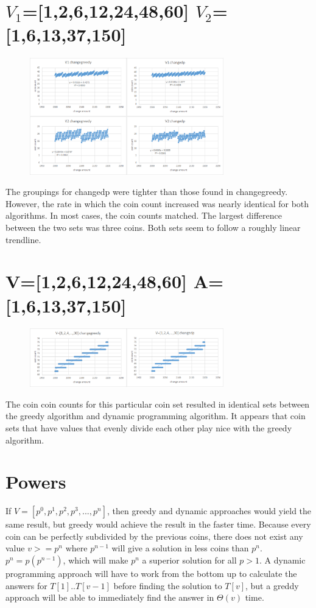 \documentclass[letWterpaper,10pt,titlepage]{article}
\begin{document}
\section{$V_1$=[1,2,6,12,24,48,60] $V_2$=[1,6,13,37,150]}
\begin{figure}[!h]
    \centering
    \includegraphics[width=0.75\textwidth]{./p5.eps}
\end{figure}
The groupings for changedp were tighter than those found in changegreedy. However, the rate in which the coin count increased was nearly identical for both algorithms. In most cases, the coin counts matched. The largest difference between the two sets was three coins. Both sets seem to follow a roughly linear trendline.

\section{V=[1,2,6,12,24,48,60] A=[1,6,13,37,150]}
\begin{figure}[!h]
    \centering
    \includegraphics[width=0.75\textwidth]{./p6.eps}
\end{figure}
The coin coin counts for this particular coin set resulted in identical sets between the greedy algorithm and dynamic programming algorithm. It appears that coin sets that have values that evenly divide each other play nice with the greedy algorithm.

\section{Powers}
If $V=[p^0,p^1,p^2,p^3,...,p^n]$, then greedy and dynamic approaches would yield the same result, but greedy would achieve the result in the faster time. Because every coin can be perfectly subdivided by the previous coins, there does not exist any value $v>=p^n$ where $p^{n-1}$ will give a solution in less coins than $p^n$. $p^n=p(p^{n-1})$, which will make $p^n$ a superior solution for all $p>1$. A dynamic programming approach will have to work from the bottom up to calculate the answers for $T[1]..T[v-1]$ before finding the solution to $T[v]$, but a greddy approach will be able to immediately find the answer in $\Theta(v)$ time.
\end{document}
